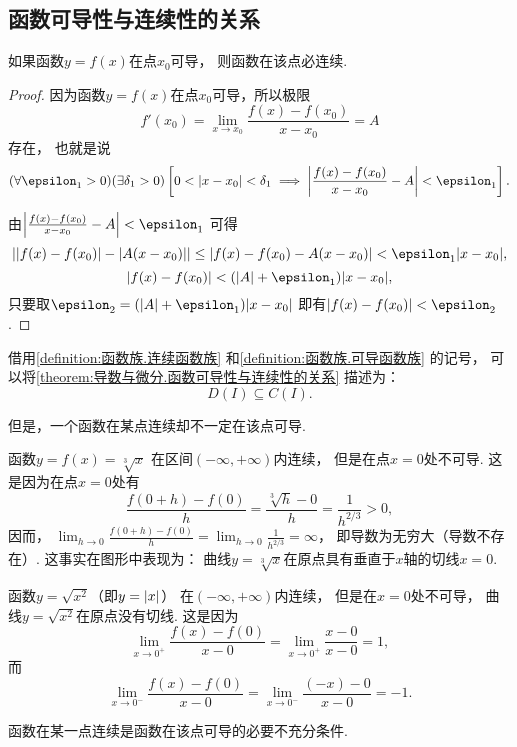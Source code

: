 \subsection{函数可导性与连续性的关系}
\begin{theorem}\label{theorem:导数与微分.函数可导性与连续性的关系}
如果函数\(y = f(x)\)在点\(x_0\)可导，
则函数在该点必连续.
\begin{proof}
因为函数\(y = f(x)\)在点\(x_0\)可导，所以极限\[
	f'(x_0) = \lim_{x \to x_0}\frac{f(x)-f(x_0)}{x-x_0} = A
\]存在，
也就是说\[
	(\forall \epsilon_1 > 0)
	(\exists \delta_1 > 0)
	\left[
		0 < \abs{x-x_0} < \delta_1
		\implies
		\abs{\frac{f(x)-f(x_0)}{x-x_0} - A} < \epsilon_1
	\right].
\]

由\(\abs{\frac{f(x)-f(x_0)}{x-x_0} - A} < \epsilon_1\)
可得\[
	\abs{\abs{f(x)-f(x_0)} - \abs{A(x-x_0)}}
	\leq \abs{f(x)-f(x_0) - A(x-x_0)}
	< \epsilon_1 \abs{x-x_0},
\]\[
	\abs{f(x)-f(x_0)} < (\abs{A} + \epsilon_1) \abs{x-x_0},
\]
只要取\(\epsilon_2 = (\abs{A} + \epsilon_1) \abs{x-x_0}\)
即有\(\abs{f(x)-f(x_0)} < \epsilon_2\).
\end{proof}
\end{theorem}
借用\cref{definition:函数族.连续函数族} 和\cref{definition:函数族.可导函数族} 的记号，
可以将\cref{theorem:导数与微分.函数可导性与连续性的关系} 描述为：\[
	D(I) \subseteq C(I).
\]

但是，一个函数在某点连续却不一定在该点可导.
\begin{example}
函数\(y=f(x)=\sqrt[3]x\)
在区间\((-\infty,+\infty)\)内连续，
但是在点\(x=0\)处不可导.
这是因为在点\(x=0\)处有\[
	\frac{f(0+h)-f(0)}{h}
	=\frac{\sqrt[3]{h}-0}{h}
	=\frac{1}{h^{2/3}}>0,
\]
因而，
\(\lim_{h\to0} \frac{f(0+h)-f(0)}{h}
=\lim_{h\to0} \frac{1}{h^{2/3}}
=\infty\)，
即导数为无穷大（导数不存在）.
这事实在图形中表现为：
曲线\(y=\sqrt[3]x\)在原点具有垂直于\(x\)轴的切线\(x=0\).
\end{example}

\begin{example}
函数\(y=\sqrt{x^2}\)（即\(y=\abs{x}\)）
在\((-\infty,+\infty)\)内连续，
但是在\(x=0\)处不可导，
曲线\(y=\sqrt{x^2}\)在原点没有切线.
这是因为\[
	\lim_{x\to0^+} \frac{f(x)-f(0)}{x-0}
	= \lim_{x\to0^+} \frac{x-0}{x-0}
	= 1,
\]
而\[
	\lim_{x\to0^-} \frac{f(x)-f(0)}{x-0}
	= \lim_{x\to0^-} \frac{(-x)-0}{x-0}
	= -1.
\]
\end{example}

\begin{remark}
函数在某一点连续是函数在该点可导的必要不充分条件.
\end{remark}


